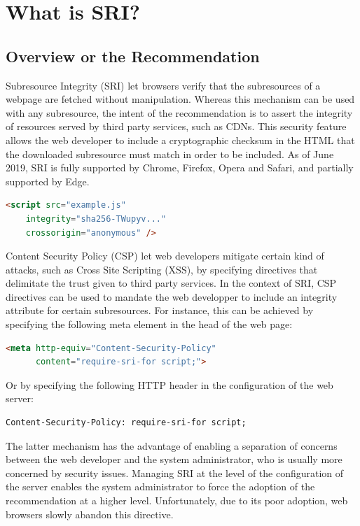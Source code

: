 \documentclass[sigconf,table]{acmart}
\begin{document}
\section{What is SRI?}

\subsection{Overview or the Recommendation}

Subresource Integrity (SRI) let browsers verify that the subresources of a webpage are fetched without manipulation.
Whereas this mechanism can be used with any subresource, the intent of the recommendation is to assert the integrity of resources served by third party services, such as CDNs.
This security feature allows the web developer to include a cryptographic checksum in the HTML that the downloaded subresource must match in order to be included.
As of June 2019, SRI is fully supported by Chrome, Firefox, Opera and Safari, and partially supported by Edge.

\begin{lstlisting}[language=HTML, basicstyle=\small]
<script src="example.js" 
	integrity="sha256-TWupyv..." 
	crossorigin="anonymous" />
\end{lstlisting}

Content Security Policy (CSP) let web developers mitigate certain kind of attacks, such as Cross Site Scripting (XSS), by specifying directives that delimitate the trust given to third party services.
In the context of SRI, CSP directives can be used to mandate the web developper to include an integrity attribute for certain subresources. 
For instance, this can be achieved by specifying the following meta element in the head of the web page: 

\begin{lstlisting}[language=HTML, basicstyle=\small]
<meta http-equiv="Content-Security-Policy" 
      content="require-sri-for script;">
\end{lstlisting}

Or by specifying the following HTTP header in the configuration of the web server:

\begin{lstlisting}[basicstyle=\small]
Content-Security-Policy: require-sri-for script;
\end{lstlisting}

The latter mechanism has the advantage of enabling a separation of concerns between the web developer and the system administrator, who is usually more concerned by security issues.
Managing SRI at the level of the configuration of the server enables the system administrator to force the adoption of the recommendation at a higher level.
Unfortunately, due to its poor adoption, web browsers slowly abandon this directive.
\end{document}
